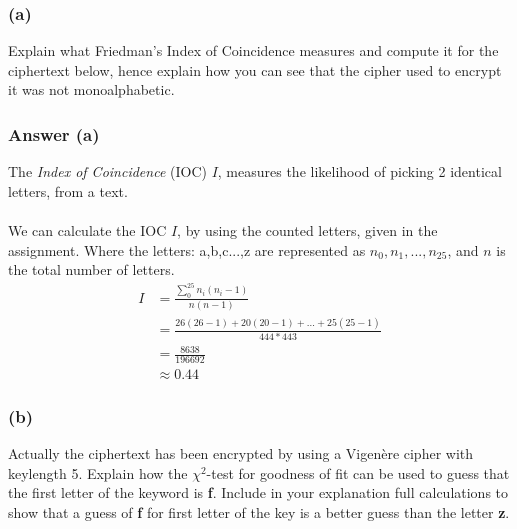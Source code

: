 \documentclass{article}
\begin{document}
	\subsubsection*{(a)}
	Explain what Friedman’s Index of Coincidence measures and compute it for the
	ciphertext below, hence explain how you can see that the cipher used to encrypt
	it was not monoalphabetic.
	
	\subsubsection*{Answer (a)}
	The \textit{Index of Coincidence} (IOC) $I$, measures the likelihood of picking 2 identical letters, from a text. 
	\\\\
	We can calculate the IOC $I$, by using the counted letters, given in the assignment. Where the  letters: a,b,c...,z are represented as $n_0,n_1,...,n_{25}$, and $n$ is the total number of letters. 
	\[
	\begin{split}
	I &= \frac{\sum_{0}^{25}n_i(n_i-1)}{n(n-1)} \\
	&=\frac{26(26-1)+20(20-1)+...+25(25-1)}{444*443} \\
	&=\frac{8638}{196692} \\
	&\approx0.44
	\end{split}
	\]
	
	\subsubsection*{(b)}
	Actually the ciphertext has been encrypted by using a Vigenère cipher with
	keylength 5. Explain how the $\chi^2$-test for goodness of fit can be used to guess that
	the first letter of the keyword is \textbf{f}. Include in your explanation full calculations to
	show that a guess of \textbf{f} for first letter of the key is a better guess than the letter \textbf{z}.
	
\end{document}
